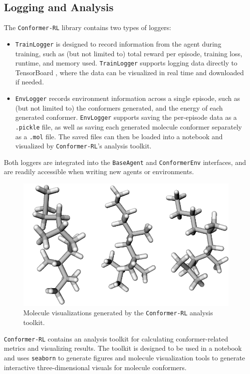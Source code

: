 \documentclass[twoside,11pt]{article}
\newcommand{\code}[1]{\texttt{#1}}
\newcommand{\titleofpaper}{Conformer-RL}
\begin{document}
\subsection{Logging and Analysis}
The \code{\titleofpaper} library contains two types of loggers:
\begin{itemize}
  \item \code{TrainLogger} is designed to record information from the agent during training, such as (but not limited to) total reward per episode, training loss, runtime, and memory used. \code{TrainLogger} supports logging data directly to TensorBoard \citep{tensorflow2015-whitepaper}, where the data can be visualized in real time and downloaded if needed.
  \item \code{EnvLogger} records environment information across a single episode, such as (but not limited to) the conformers generated, and the energy of each generated conformer. \code{EnvLogger} supports saving the per-episode data as a \code{.pickle} file, as well as saving each generated molecule conformer separately as a \code{.mol} file. The saved files can then be loaded into a notebook and visualized by \code{\titleofpaper}'s analysis toolkit.
\end{itemize}
Both loggers are integrated into the \code{BaseAgent} and \code{ConformerEnv} interfaces, and are readily accessible when writing new agents or environments.

\begin{figure}[h]
  \centering
  \includegraphics[scale=0.7]{molecules.png}
  \caption{
    Molecule visualizations generated by the \code{\titleofpaper} analysis toolkit.
  }
  \label{fig:molecules}
\end{figure}

\code{\titleofpaper} contains an analysis toolkit for calculating conformer-related metrics and visualizing results. The toolkit is designed to be used in a notebook and uses \code{seaborn} \citep{waskom2021seaborn} to generate figures and molecule visualization tools to generate interactive three-dimensional visuals for molecule conformers.
\end{document}
